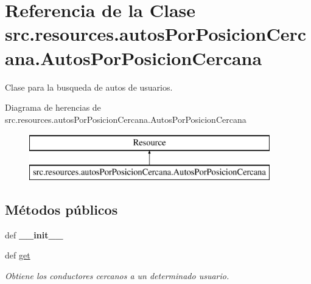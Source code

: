 \hypertarget{classsrc_1_1resources_1_1autos_por_posicion_cercana_1_1_autos_por_posicion_cercana}{\section{Referencia de la Clase src.\-resources.\-autos\-Por\-Posicion\-Cercana.\-Autos\-Por\-Posicion\-Cercana}
\label{classsrc_1_1resources_1_1autos_por_posicion_cercana_1_1_autos_por_posicion_cercana}
}


Clase para la busqueda de autos de usuarios.  


Diagrama de herencias de src.\-resources.\-autos\-Por\-Posicion\-Cercana.\-Autos\-Por\-Posicion\-Cercana\begin{figure}[H]
\begin{center}
\leavevmode
\includegraphics[height=2.000000cm]{classsrc_1_1resources_1_1autos_por_posicion_cercana_1_1_autos_por_posicion_cercana}
\end{center}
\end{figure}
\subsection*{Métodos públicos}
\begin{DoxyCompactItemize}
\item 
\hypertarget{classsrc_1_1resources_1_1autos_por_posicion_cercana_1_1_autos_por_posicion_cercana_ab915321f8adc8b09dca3e6b2a289eedf}{def {\bfseries \-\_\-\-\_\-init\-\_\-\-\_\-}}\label{classsrc_1_1resources_1_1autos_por_posicion_cercana_1_1_autos_por_posicion_cercana_ab915321f8adc8b09dca3e6b2a289eedf}

\item 
def \hyperlink{classsrc_1_1resources_1_1autos_por_posicion_cercana_1_1_autos_por_posicion_cercana_a5411713030f29c3612462e582af92b90}{get}
\begin{DoxyCompactList}\small\item\em Obtiene los conductores cercanos a un determinado usuario. \end{DoxyCompactList}\end{DoxyCompactItemize}
